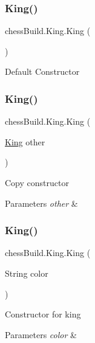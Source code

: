 \subsubsection{\texorpdfstring{King()}{King()}\hspace{0.1cm}{\footnotesize\ttfamily [1/4]}}
{\footnotesize\ttfamily chess\+Build.\+King.\+King (\begin{DoxyParamCaption}{ }\end{DoxyParamCaption})}

Default Constructor \mbox{\label{classchess_build_1_1_king_ad07e90a3afe7fed1830d734dbd4817a8}} 
\subsubsection{\texorpdfstring{King()}{King()}\hspace{0.1cm}{\footnotesize\ttfamily [2/4]}}
{\footnotesize\ttfamily chess\+Build.\+King.\+King (\begin{DoxyParamCaption}\item[{\hyperlink{classchess_build_1_1_king}{King}}]{other }\end{DoxyParamCaption})}

Copy constructor 
\begin{DoxyParams}{Parameters}
{\em other} & \\
\hline
\end{DoxyParams}
\mbox{\label{classchess_build_1_1_king_a24d4ed37d11c00c7475ed7fe529ece66}} 
\subsubsection{\texorpdfstring{King()}{King()}\hspace{0.1cm}{\footnotesize\ttfamily [3/4]}}
{\footnotesize\ttfamily chess\+Build.\+King.\+King (\begin{DoxyParamCaption}\item[{String}]{color }\end{DoxyParamCaption})}

Constructor for king 
\begin{DoxyParams}{Parameters}
{\em color} & \\
\hline
\end{DoxyParams}
\mbox{\label{classchess_build_1_1_king_a3f2ec37749356fa6f5faaabaa0bb2d07}} 
